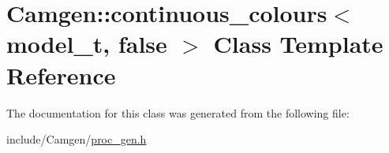 \hypertarget{a00104}{}\section{Camgen\+:\+:continuous\+\_\+colours$<$ model\+\_\+t, false $>$ Class Template Reference}
\label{a00104}


The documentation for this class was generated from the following file\+:\begin{DoxyCompactItemize}
\item 
include/\+Camgen/\hyperlink{a00730}{proc\+\_\+gen.\+h}\end{DoxyCompactItemize}
